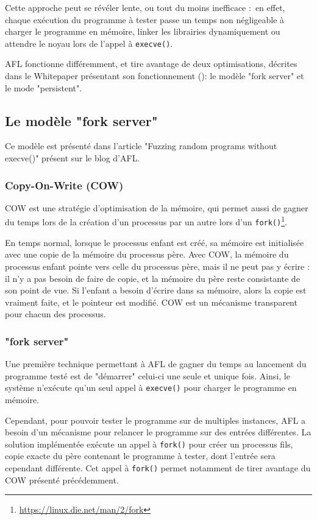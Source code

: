 Cette approche peut se révéler lente, ou tout du moins inefficace : en effet, chaque exécution du programme à tester passe un temps non négligeable à charger le programme en mémoire, linker les librairies dynamiquement ou attendre le noyau lors de l'appel à \lstinline{execve()}.

AFL fonctionne différemment, et tire avantage de deux optimisations, décrites dans le Whitepaper présentant son fonctionnement (\cite[section 10 : The fork server]{technical-details}): le modèle "fork server" et le mode "persistent".


\subsection{Le modèle "fork server"}

Ce modèle est présenté dans l'article "Fuzzing random programs without execve()"\cite{fuzzing-binaries-without-execve} présent sur le blog d'AFL.

\subsubsection{Copy-On-Write (COW)}

COW est une stratégie d'optimisation de la mémoire, qui permet aussi de gagner du temps lors de la création d'un processus par un autre lors d'un \lstinline{fork()}\footnote{\url{https://linux.die.net/man/2/fork}}.

En temps normal, lorsque le processus enfant est créé, sa mémoire est initialisée avec une copie de la mémoire du processus père.
Avec COW, la mémoire du processus enfant pointe vers celle du processus père, mais il ne peut pas y écrire : il n'y a pas besoin de faire de copie, et la mémoire du père reste consistante de son point de vue.
Si l'enfant a besoin d'écrire dans sa mémoire, alors la copie est vraiment faite, et le pointeur est modifié.
COW est un mécanisme transparent pour chacun des processus.

\subsubsection{"fork server"}
Une première technique permettant à AFL de gagner du temps au lancement du programme testé est de "démarrer" celui-ci une seule et unique fois.
Ainsi, le système n'exécute qu'un seul appel à \lstinline{execve()} pour charger le programme en mémoire.

Cependant, pour pouvoir tester le programme sur de multiples instances, AFL a besoin d'un mécanisme pour relancer le programme sur des entrées différentes.
La solution implémentée exécute un appel à \lstinline{fork()} pour créer un processus fils, copie exacte du père contenant le programme à tester, dont l'entrée sera cependant différente.
Cet appel à \lstinline{fork()} permet notamment de tirer avantage du COW présenté précédemment.


